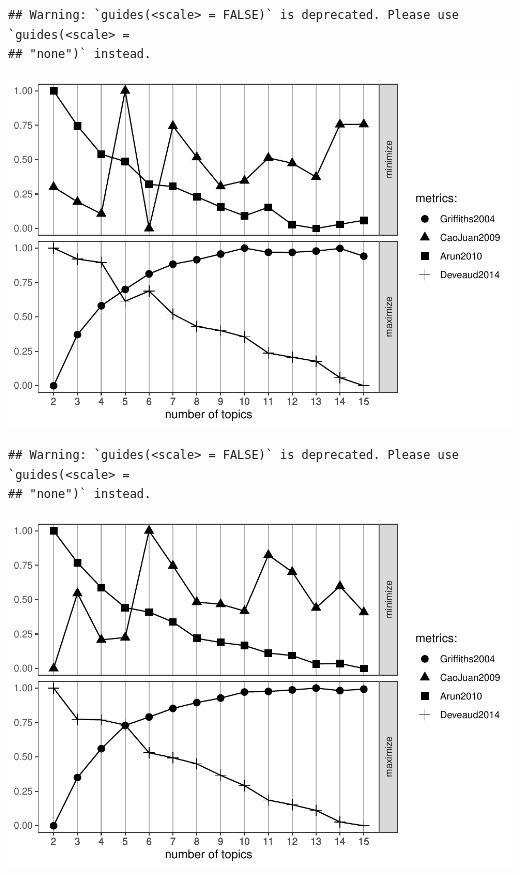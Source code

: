 \documentclass[]{elsarticle} %
\begin{document}
\begin{verbatim}
## Warning: `guides(<scale> = FALSE)` is deprecated. Please use `guides(<scale> =
## "none")` instead.
\end{verbatim}

\includegraphics{AST-Framing-Ontario_files/figure-latex/evaluate-lda-3.pdf}

\begin{verbatim}
## Warning: `guides(<scale> = FALSE)` is deprecated. Please use `guides(<scale> =
## "none")` instead.
\end{verbatim}

\includegraphics{AST-Framing-Ontario_files/figure-latex/evaluate-lda-4.pdf}
\end{document}
